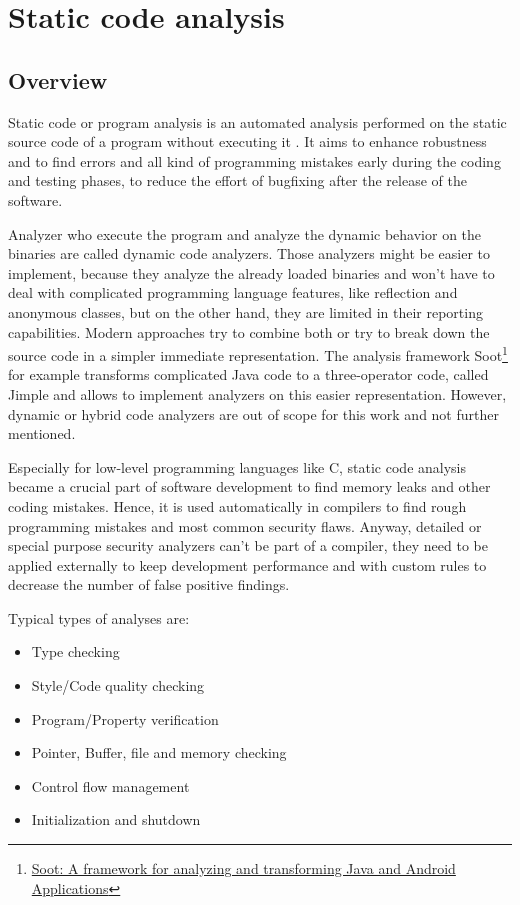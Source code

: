 \documentclass[conference]{IEEEtran}
\begin{document}




\section{Static code analysis}
\subsection{Overview}
Static code or program analysis is an automated analysis performed on the static source code of a program without executing it \cite{Static_Code_Analysis_def}.
It aims to enhance robustness and to find errors and all kind of programming mistakes early during the coding and testing phases, to reduce the effort of bugfixing after the release of the software.


Analyzer who execute the program and analyze the dynamic behavior on the binaries are called dynamic code analyzers.
Those analyzers might be easier to implement, because they analyze the already loaded binaries and won't have to deal with complicated programming language features, like reflection and anonymous classes, but on the other hand, they are limited in their reporting capabilities.
Modern approaches try to combine both or try to break down the source code in a simpler immediate representation.
The analysis framework Soot\footnote{\href{https://sable.github.io/soot/}{Soot: A framework for analyzing and transforming Java and Android Applications}} for example transforms complicated Java code to a three-operator code, called Jimple and allows to implement analyzers on this easier representation.
However, dynamic or hybrid code analyzers are out of scope for this work and not further mentioned.


Especially for low-level programming languages like C, static code analysis became a crucial part of software development to find memory leaks and other coding mistakes.
Hence, it is used automatically in compilers to find rough programming mistakes and most common security flaws.
Anyway, detailed or special purpose security analyzers can't be part of a compiler, they need to be applied externally to keep development performance and with custom rules to decrease the number of false positive findings.

Typical types of analyses are:
\begin{itemize}
	\item Type checking
	\item Style/Code quality checking
	\item Program/Property verification
	\item Pointer, Buffer, file and memory checking
	\item Control flow management
	\item Initialization and shutdown
\end{itemize}
\end{document}

